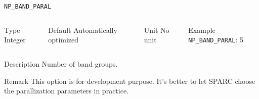 \begin{frame}[allowframebreaks]{\texttt{NP\_BAND\_PARAL}} \label{NP_BAND_PARAL}
\vspace*{-12pt}
\begin{columns}
\begin{block}{Type}
Integer
\end{block}

\begin{block}{Default}
Automatically optimized
\end{block}

\begin{block}{Unit}
No unit
\end{block}

\begin{block}{Example}
\texttt{NP\_BAND\_PARAL}: 5
\end{block}
\end{columns}

\begin{block}{Description}
Number of band groups.
\end{block}

\begin{block}{Remark}
This option is for development purpose. It's better to let SPARC choose the parallization parameters in practice.
\end{block}
\end{frame}


